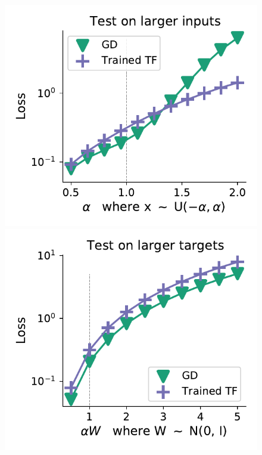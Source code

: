 \documentclass{article}
\theoremstyle{plain}
\theoremstyle{definition}
\theoremstyle{remark}
\begin{document}
\begin{figure}
\begin{center}
\begin{minipage}{.28\textwidth}
\begin{center}
  \end{center}
  \vspace{-10pt}
\end{minipage}
\begin{minipage}{.23\textwidth}
  \centering
  \begin{center}
    \includegraphics[width=1.\textwidth]{Final_figures/softmax/normal_14.pdf}
  \end{center}
  \vspace{-10pt}
\end{minipage}
\begin{minipage}{.23\textwidth}
  \centering
  \begin{center}
    \includegraphics[width=1.\textwidth]{Final_figures/softmax/normal_19.pdf}

\end{center}
\end{minipage}
\end{center}
\end{figure}
\end{document}
